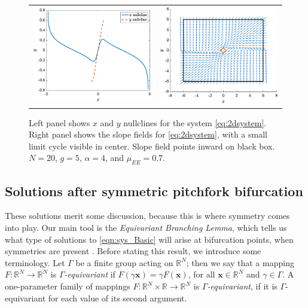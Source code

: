 \documentclass[11pt,reqno]{amsart}
\newcommand{\xvec}{\mathbf{x}}
\begin{document}
\begin{figure}
    \centering
    \begin{tabular}{cc}
    \includegraphics[width=8cm]{images/nullclines.eps} &
    \includegraphics[width=8cm]{images/trappingregion.eps}
    \end{tabular}
    \caption{Left panel shows $x$ and $y$ nullclines for the system \cref{eq:2dsystem}. Right panel shows the slope fields for \cref{eq:2dsystem}, with a small limit cycle visible in center.  Slope field points inward on black box. $N = 20$, $g = 5$, $\alpha = 4$, and $\mu_{EE} = 0.7$.}
    \label{fig:nullclines}
\end{figure}


\subsection{Solutions after symmetric pitchfork bifurcation}
These solutions merit some discussion, because this is where symmetry comes into play.  Our main tool is the \emph{Equivariant Branching Lemma}, which tells us what type of solutions to \cref{eqn:sys_Basic} will arise at bifurcation points, when symmetries are present \cites{MR631456,GSS88Vol2,HoyleRebeccaB2006Pf:a}. Before stating this result, we introduce some terminology. Let $\Gamma$ be a finite group acting on $\mathbb{R}^N$; then we say that a mapping $F: \mathbb{R}^N  \rightarrow \mathbb{R}^N$ is \textit{$\Gamma$-equivariant} if $F(\gamma \xvec) = \gamma F(\xvec)$, for all $\xvec \in \mathbb{R}^N$ and $\gamma \in \Gamma$.  A one-parameter family of mappings $F: \mathbb{R}^N \times \mathbb{R}  \rightarrow \mathbb{R}^N$ is \textit{$\Gamma$-equivariant}, if it is $\Gamma$-equivariant for each value of its second argument.
\end{document}
